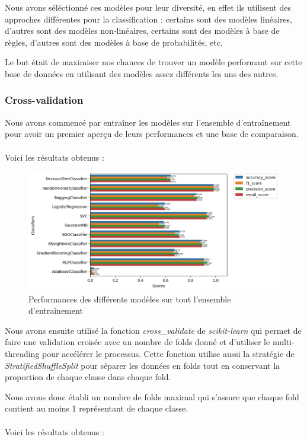 \documentclass{article}
\begin{document}
Nous avons séléctionné ces modèles pour leur diversité, en effet ils utilisent
des approches différentes pour la classification : certains sont des modèles linéaires,
d'autres sont des modèles non-linéaires, certains sont des modèles à base de règles,
d'autres sont des modèles à base de probabilités, etc. 

Le but était de maximiser nos chances de trouver un modèle performant sur cette
base de données en utilisant des modèles assez différents les uns des autres.

\subsubsection{Cross-validation}
Nous avons commencé par entraîner les modèles sur l'ensemble d'entraînement pour
avoir un premier aperçu de leurs performances et une base de comparaison.
\\\\
Voici les résultats obtenus :

\begin{figure}[h]
    \centering
    \includegraphics[width=1.2\textwidth]{img/all_perfs_without_cv.png}
    \caption{Performances des différents modèles sur tout l'ensemble d'entraînement}
\end{figure}

Nous avons ensuite utilisé la fonction \textit{cross\_validate} \cite{CV} de \textit{scikit-learn}
qui permet de faire une validation croisée avec un nombre de folds donné et d'utiliser 
le multi-threading pour accélérer le processus. Cette fonction utilise aussi la 
stratégie de \textit{StratifiedShuffleSplit} \cite{SSS} pour séparer les données en
folds tout en conservant la proportion de chaque classe dans chaque fold.

Nous avons donc établi un nombre de folds maximal qui s'assure que chaque fold 
contient au moins 1 représentant de chaque classe.
\\\\
Voici les résultats obtenus :
\end{document}
